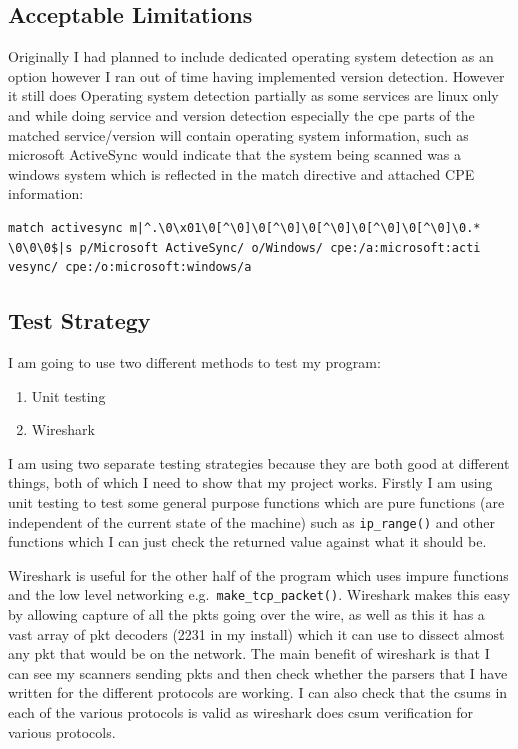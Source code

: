 \documentclass[titlepage]{article}
\let\Oldsubsection\subsection{}
\renewcommand{\subsection}{\FloatBarrier\Oldsubsection}
\begin{document}
\subsection{Acceptable Limitations}

Originally I had planned to include dedicated operating system detection as an option
however I ran out of time having implemented version detection. However it still does
Operating system detection partially as some \glspl{service} are linux only and while doing
\gls{service} and version detection especially the \gls{cpe} parts
of the matched \gls{service}/version will contain operating system information, such as
microsoft ActiveSync would indicate that the system being scanned was a windows system
which is reflected in the match directive and attached CPE information:
\begin{verbatim}
match activesync m|^.\0\x01\0[^\0]\0[^\0]\0[^\0]\0[^\0]\0[^\0]\0.*
\0\0\0$|s p/Microsoft ActiveSync/ o/Windows/ cpe:/a:microsoft:acti
vesync/ cpe:/o:microsoft:windows/a
\end{verbatim}

\subsection{Test Strategy}

I am going to use two different methods to test my program:
\begin{enumerate}
\item{Unit testing}
\item{Wireshark}
\end{enumerate}
I am using two separate testing strategies because they are both good at different things,
both of which I need to show that my project works. Firstly I am using unit testing to test
some general purpose functions which are pure functions (are independent of the current state
of the machine) such as \verb|ip_range()| and other functions which I can just check the returned
value against what it should be.

Wireshark is useful for the other half of the program which uses impure functions and the low level 
networking e.g.\ \verb|make_tcp_packet()|. Wireshark makes this easy by allowing capture of all the 
\glspl{pkt} going over the wire, as well as this it has a vast array of \gls{pkt} decoders (2231 in 
my install) which it can use to dissect almost any \gls{pkt} that would be on the network. The main 
benefit of wireshark is that I can see my scanners sending \glspl{pkt} and then check whether the 
parsers that I have written for the different protocols are working. I can also check that the 
\glspl{csum} in each of the various protocols is valid as wireshark does \gls{csum} verification for 
various protocols. 
\end{document}
